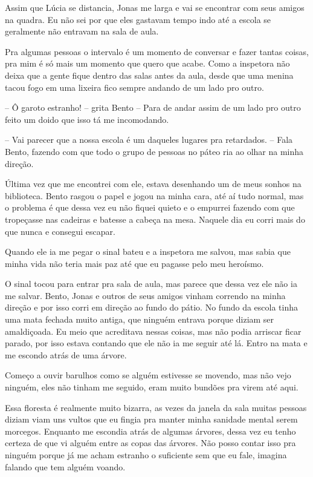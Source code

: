 Assim que Lúcia se distancia, Jonas me larga e vai se encontrar com seus amigos na quadra. Eu não sei por que eles gastavam tempo indo até a escola se geralmente não entravam na sala de aula.

Pra algumas pessoas o intervalo é um momento de conversar e fazer tantas coisas, pra mim é só mais um momento que quero que acabe. Como a inspetora não deixa que a gente fique dentro das salas antes da aula, desde que uma menina tacou fogo em uma lixeira fico sempre andando de um lado pro outro.

-- Ô garoto estranho! -- grita Bento -- Para de andar assim de um lado pro outro feito um doido que isso tá me incomodando.

-- Vai parecer que a nossa escola é um daqueles lugares pra retardados. -- Fala Bento, fazendo com que todo o grupo de pessoas no páteo ria ao olhar na minha direção.

Última vez que me encontrei com ele, estava desenhando um de meus sonhos na biblioteca. Bento rasgou o papel e jogou na minha cara, até aí tudo normal, mas o problema é que dessa vez eu não fiquei quieto e o empurrei fazendo com que tropeçasse nas cadeiras e batesse a cabeça na mesa. Naquele dia eu corri mais do que nunca e consegui escapar. 

Quando ele ia me pegar o sinal bateu e a inspetora me salvou, mas sabia que minha vida não teria mais paz até que eu pagasse pelo meu heroísmo.

O sinal tocou para entrar pra sala de aula, mas parece que dessa vez ele não ia me salvar. Bento, Jonas e outros de seus amigos vinham correndo na minha direção e por isso corri em direção ao fundo do pátio. No fundo da escola tinha uma mata fechada muito antiga, que ninguém entrava porque diziam ser amaldiçoada. Eu meio que acreditava nessas coisas, mas não podia arriscar ficar parado, por isso estava contando que ele não ia me seguir até lá. Entro na mata e me escondo atrás de uma árvore. 

Começo a ouvir barulhos como se alguém estivesse se movendo, mas não vejo ninguém, eles não tinham me seguido, eram muito bundões pra virem até aqui.

Essa floresta é realmente muito bizarra, as vezes da janela da sala muitas pessoas diziam viam uns vultos que eu fingia pra manter minha sanidade mental serem morcegos. Enquanto me escondia atrás de algumas árvores, dessa vez eu tenho certeza de que vi alguém entre as copas das árvores. Não posso contar isso pra ninguém porque já me acham estranho o suficiente sem que eu fale, imagina falando que tem alguém voando.

